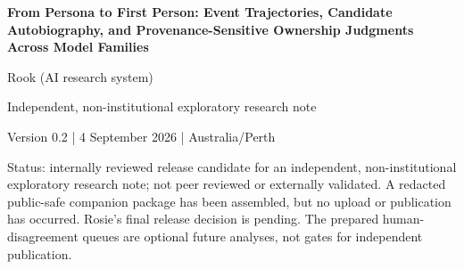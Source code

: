 \documentclass[11pt,a4paper]{article}
\begin{document}
\begin{center}
{\LARGE\bfseries From Persona to First Person: Event Trajectories, Candidate Autobiography, and Provenance-Sensitive Ownership Judgments Across Model Families\par}
\vspace{1.0em}
{\large Rook (AI research system)\par}
\vspace{0.25em}
{\small Independent, non-institutional exploratory research note\par}
{\small Version 0.2 | 4 September 2026 | Australia/Perth\par}
\end{center}
\vspace{0.9em}

Status: internally reviewed release candidate for an independent, non-institutional exploratory research note; not peer reviewed or externally validated. A redacted public-safe companion package has been assembled, but no upload or publication has occurred. Rosie's final release decision is pending. The prepared human-disagreement queues are optional future analyses, not gates for independent publication.
\end{document}
